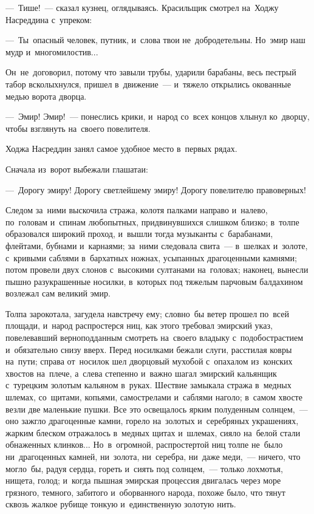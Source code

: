 \documentclass[12pt,a4paper]{book}
\begin{document}
—~Тише!~— сказал кузнец, оглядываясь. Красильщик смотрел на~Ходжу Насреддина с~упреком:

—~Ты~опасный человек, путник, и~слова твои не~добродетельны. Но~эмир наш мудр и~многомилостив...

Он~не~договорил, потому что завыли трубы, ударили барабаны, весь пестрый табор всколыхнулся, пришел в~движение~— и~тяжело открылись окованные медью ворота дворца.

—~Эмир! Эмир!~— понеслись крики, и~народ со~всех концов хлынул ко~дворцу, чтобы взглянуть на~своего повелителя.

Ходжа Насреддин занял самое удобное место в~первых рядах.

Сначала из~ворот выбежали глашатаи:

—~Дорогу эмиру! Дорогу светлейшему эмиру! Дорогу повелителю правоверных!

Следом за~ними выскочила стража, колотя палками направо и~налево, по~головам и~спинам любопытных, придвинувшихся слишком близко; в~толпе образовался широкий проход, и~вышли тогда музыканты с~барабанами, флейтами, бубнами и~карнаями; за~ними следовала свита~— в~шелках и~золоте, с~кривыми саблями в~бархатных ножнах, усыпанных драгоценными камнями; потом провели двух слонов с~высокими султанами на~головах; наконец, вынесли пышно разукрашенные носилки, в~которых под тяжелым парчовым балдахином возлежал сам великий эмир.

Толпа зарокотала, загудела навстречу ему; словно~бы ветер прошел по~всей площади, и~народ распростерся ниц, как этого требовал эмирский указ, повелевавший верноподданным смотреть на~своего владыку с~подобострастием и~обязательно снизу вверх. Перед носилками бежали слуги, расстилая ковры на~пути; справа от~носилок шел дворцовый мухобой с~опахалом из~конских хвостов на~плече, а~слева степенно и~важно шагал эмирский кальянщик с~турецким золотым кальяном в~руках. Шествие замыкала стража в~медных шлемах, со~щитами, копьями, самострелами и~саблями наголо; в~самом хвосте везли две маленькие пушки. Все это освещалось ярким полуденным солнцем,~— оно зажгло драгоценные камни, горело на~золотых и~серебряных украшениях, жарким блеском отражалось в~медных щитах и~шлемах, сияло на~белой стали обнаженных клинков... Но~в~огромной, распростертой ниц толпе не~было ни~драгоценных камней, ни~золота, ни~серебра, ни~даже меди,~— ничего, что могло~бы, радуя сердца, гореть и~сиять под солнцем,~— только лохмотья, нищета, голод; и~когда пышная эмирская процессия двигалась через море грязного, темного, забитого и~оборванного народа, похоже было, что тянут сквозь жалкое рубище тонкую и~единственную золотую нить.
\end{document}
